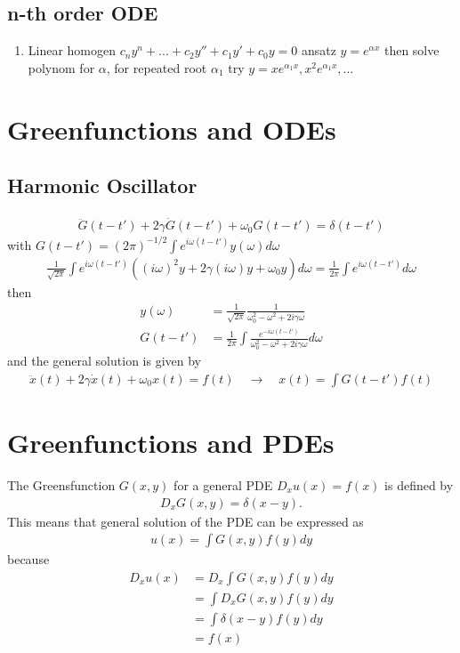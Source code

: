 \documentclass[10pt,a4paper]{book}
\theoremstyle{definition}
\begin{document}
\subsection{n-th order ODE}
\begin{enumerate}
\item Linear homogen $c_ny^{n}+...+c_{2}y''+c_{1}y'+c_{0}y=0$ ansatz $y=e^{\alpha x}$ then solve polynom for $\alpha$,  for repeated root $\alpha_1$ try $y=xe^{\alpha_1 x}, x^2e^{\alpha_1 x}, ...$
\end{enumerate}




\section{Greenfunctions and ODEs}
\subsection{Harmonic Oscillator}
\begin{align}
\ddot{G}(t-t')+2\gamma\dot{G}(t-t')+\omega_0G(t-t')=\delta(t-t')
\end{align}
with $G(t-t')=(2\pi)^{-1/2}\int e^{i\omega (t-t')}y(\omega)d\omega$
\begin{align}
\frac{1}{\sqrt{2\pi}}\int e^{i\omega (t-t')}\left((i\omega)^2y+2\gamma(i\omega)y+\omega_0y\right)d\omega=\frac{1}{2\pi}\int e^{i\omega(t-t')}d\omega
\end{align}
then
\begin{align}
y(\omega)&=\frac{1}{\sqrt{2\pi}}\frac{1}{\omega_0^2-\omega^2+2i\gamma\omega}\\
G(t-t')&=\frac{1}{2\pi}\int \frac{e^{-i\omega(t-t')}}{\omega_0^2-\omega^2+2i\gamma\omega}d\omega
\end{align}
and the general solution is given by
\begin{align}
\ddot{x}(t)+2\gamma\dot{x}(t)+\omega_0x(t)=f(t)\quad\rightarrow\quad
x(t)=\int G(t-t')f(t)
\end{align}

\section{Greenfunctions and PDEs}
The Greensfunction $G(x,y)$ for a general PDE $D_x u(x) = f(x)$ is defined by
\begin{align}
    D_x G(x,y) = \delta(x-y).
\end{align}
This means that general solution of the PDE can be expressed as
\begin{align}
    u(x)=\int G(x,y)f(y)dy
\end{align}
because
\begin{align}
    D_x u(x)
    &=D_x \int G(x,y)f(y)dy\\
    &=\int D_x G(x,y)f(y)dy\\
    &=\int \delta(x-y) f(y)dy\\
    &=f(x)
\end{align}
\end{document}
